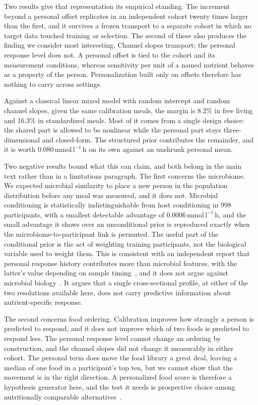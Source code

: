 \documentclass[pdflatex,sn-nature]{sn-jnl}
\newcommand{\aucunit}{\mathrm{mmol\,l^{-1}\,h}}
\theoremstyle{thmstyleone}
\theoremstyle{thmstyletwo}
\theoremstyle{thmstylethree}
\begin{document}
Two results give that representation its empirical standing. The increment beyond a personal offset replicates in an independent cohort twenty times larger than the first, and it survives a frozen transport to a separate cohort in which no target data touched training or selection. The second of these also produces the finding we consider most interesting. Channel slopes transport; the personal response level does not. A personal offset is tied to the cohort and its measurement conditions, whereas sensitivity per unit of a named nutrient behaves as a property of the person. Personalization built only on offsets therefore has nothing to carry across settings.

Against a classical linear mixed model with random intercept and random channel slopes, given the same calibration meals, the margin is 8.2\% in free living and 16.3\% in standardized meals. Most of it comes from a single design choice: the shared part is allowed to be nonlinear while the personal part stays three-dimensional and closed-form. The structured prior contributes the remainder, and it is worth 0.080\,$\aucunit$ on its own against an unshrunk personal mean.

Two negative results bound what this can claim, and both belong in the main text rather than in a limitations paragraph. The first concerns the microbiome. We expected microbial similarity to place a new person in the population distribution before any meal was measured, and it does not. Microbial conditioning is statistically indistinguishable from host conditioning in 998 participants, with a smallest detectable advantage of 0.0006\,$\aucunit$, and the small advantage it shows over an unconditional prior is reproduced exactly when the microbiome-to-participant link is permuted. The useful part of the conditional prior is the act of weighting training participants, not the biological variable used to weight them. This is consistent with an independent report that personal response history contributes more than microbial features, with the latter's value depending on sample timing~\cite{contribution2026}, and it does not argue against microbial biology~\cite{quinn,lancaster2022}. It argues that a single cross-sectional profile, at either of the two resolutions available here, does not carry predictive information about nutrient-specific response.

The second concerns food ordering. Calibration improves how strongly a person is predicted to respond, and it does not improve which of two foods is predicted to respond less. The personal response level cannot change an ordering by construction, and the channel slopes did not change it measurably in either cohort. The personal term does move the food library a great deal, leaving a median of one food in a participant's top ten, but we cannot show that the movement is in the right direction. A personalized food score is therefore a hypothesis generator here, and the test it needs is prospective choice among nutritionally comparable alternatives~\cite{guess2024,willett}.
\end{document}
